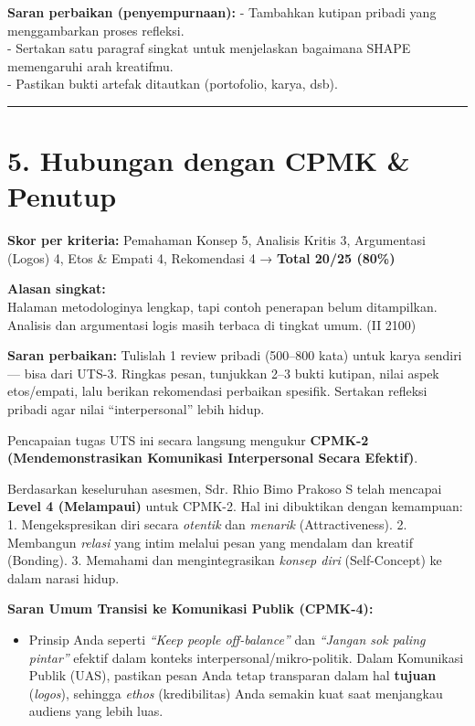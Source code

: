 \documentclass[
  letterpaper,
  DIV=11,
  numbers=noendperiod]{scrreprt}
\providecommand{\tightlist}{%
  \setlength{\itemsep}{0pt}\setlength{\parskip}{0pt}}
\begin{document}
\textbf{Saran perbaikan (penyempurnaan):} - Tambahkan kutipan pribadi
yang menggambarkan proses refleksi.\\
- Sertakan satu paragraf singkat untuk menjelaskan bagaimana SHAPE
memengaruhi arah kreatifmu.\\
- Pastikan bukti artefak ditautkan (portofolio, karya, dsb).

\begin{center}\rule{0.5\linewidth}{0.5pt}\end{center}

\section{5. Hubungan dengan CPMK \&
Penutup}\label{hubungan-dengan-cpmk-penutup}

\textbf{Skor per kriteria:} Pemahaman Konsep 5, Analisis Kritis 3,
Argumentasi (Logos) 4, Etos \& Empati 4, Rekomendasi 4 → \textbf{Total
20/25 (80\%)}

\textbf{Alasan singkat:}\\
Halaman metodologinya lengkap, tapi contoh penerapan belum ditampilkan.
Analisis dan argumentasi logis masih terbaca di tingkat umum. (II 2100)

\textbf{Saran perbaikan:} Tulislah 1 review pribadi (500--800 kata)
untuk karya sendiri --- bisa dari UTS-3. Ringkas pesan, tunjukkan 2--3
bukti kutipan, nilai aspek etos/empati, lalu berikan rekomendasi
perbaikan spesifik. Sertakan refleksi pribadi agar nilai
``interpersonal'' lebih hidup.

Pencapaian tugas UTS ini secara langsung mengukur \textbf{CPMK-2
(Mendemonstrasikan Komunikasi Interpersonal Secara Efektif)}.

Berdasarkan keseluruhan asesmen, Sdr. Rhio Bimo Prakoso S telah mencapai
\textbf{Level 4 (Melampaui)} untuk CPMK-2. Hal ini dibuktikan dengan
kemampuan: 1. Mengekspresikan diri secara \emph{otentik} dan
\emph{menarik} (Attractiveness). 2. Membangun \emph{relasi} yang intim
melalui pesan yang mendalam dan kreatif (Bonding). 3. Memahami dan
mengintegrasikan \emph{konsep diri} (Self-Concept) ke dalam narasi
hidup.

\textbf{Saran Umum Transisi ke Komunikasi Publik (CPMK-4):}

\begin{itemize}
\tightlist
\item
  Prinsip Anda seperti \emph{``Keep people off-balance''} dan
  \emph{``Jangan sok paling pintar''} efektif dalam konteks
  interpersonal/mikro-politik. Dalam Komunikasi Publik (UAS), pastikan
  pesan Anda tetap transparan dalam hal \textbf{tujuan} (\emph{logos}),
  sehingga \emph{ethos} (kredibilitas) Anda semakin kuat saat menjangkau
  audiens yang lebih luas.
\end{itemize}
\end{document}
